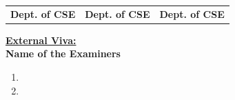 \begin{titlepage}
\begin{tabular}{l  l  l}
\textbf{Dept. of CSE} & \hspace{0.7cm}\textbf{Dept. of CSE}  & \hspace{0.7cm}\textbf{Dept. of CSE}\\[0.2in]
\end{tabular}
\begin{multicols}{2}
\textup{\underline{\textbf{External Viva:}}} \\ 
\textup{\textbf{Name of the Examiners}} \\
\begin{enumerate}
\item{}
\item{}
\end{enumerate}
\columnbreak
\end{multicols}
\end{titlepage}